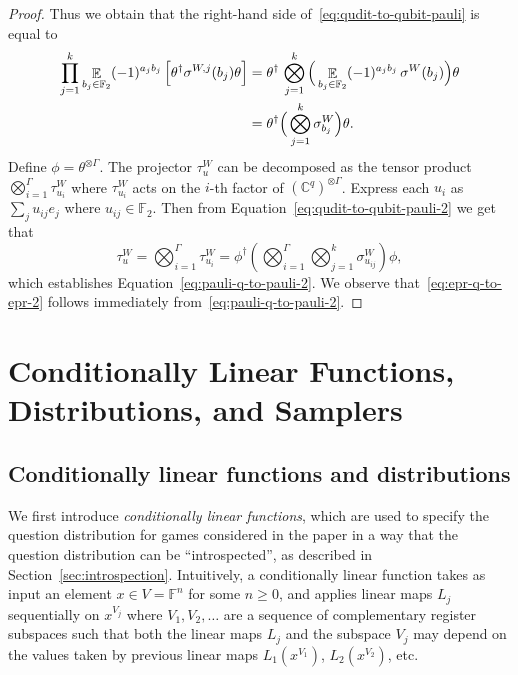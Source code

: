 \documentclass[11pt]{article}
\theoremstyle{definition}
\newcommand{\C}{\ensuremath{\mathbb{C}}}
\newcommand{\F}{\ensuremath{\mathbb{F}}}
\newcommand{\E}{\mathop{\mathbb{E}}\displaylimits} %
\begin{document}
\begin{proof}
  Thus we obtain that the right-hand side of~\eqref{eq:qudit-to-qubit-pauli} is
  equal to
  \begin{align}
		\prod_{j=1}^k \E_{b_j \in \F_2} (-1)^{a_j b_j} \,
    \Big [ \theta^\dagger \sigma^{W,j}(b_j) \theta \Big ]
    & = \theta^\dagger \, \bigotimes_{j=1}^k
      \Big ( \E_{b_j \in \F_2} (-1)^{a_j b_j} \, \sigma^{W}(b_j) \Big) \theta \\
		& = \theta^\dagger \Big (\bigotimes_{j=1}^k \sigma^W_{b_j} \Big) \theta.
		\label{eq:qudit-to-qubit-pauli-2}
  \end{align}
  Define $\phi = \theta^{\otimes \Gamma}$. The projector $\tau^W_u$ can be
  decomposed as the tensor product $\bigotimes_{i=1}^\Gamma \tau^{W}_{u_i}$
  where $\tau^{W}_{u_i}$ acts on the $i$-th factor of $(\C^q)^{\otimes \Gamma}$.
  Express each $u_i$ as $\sum_j u_{ij} e_j$ where $u_{ij} \in \F_2$. Then from
  Equation~\eqref{eq:qudit-to-qubit-pauli-2} we get that
  \begin{equation}
  	\tau^W_u = \bigotimes_{i=1}^\Gamma \tau^W_{u_i}
    = \phi^\dagger \left( \bigotimes_{i=1}^\Gamma
      \bigotimes_{j=1}^k \sigma^W_{u_{ij}} \right) \phi,
  \end{equation}
  which establishes Equation~\eqref{eq:pauli-q-to-pauli-2}. We observe
  that~\eqref{eq:epr-q-to-epr-2} follows immediately
  from~\eqref{eq:pauli-q-to-pauli-2}.
\end{proof}

\section{Conditionally Linear Functions, Distributions, and Samplers}
\label{sec:linear}

\subsection{Conditionally linear functions and distributions}
\label{sec:cl}

We first introduce \emph{conditionally linear functions}, which are used to
specify the question distribution for games considered in the paper in a way
that the question distribution can be ``introspected'', as described in
Section~\ref{sec:introspection}.
Intuitively, a conditionally linear function takes as input an element $x\in V =
\F^n$ for some $n\geq 0$, and applies linear maps $L_j$ sequentially on
$x^{V_j}$ where $V_1,V_2,\ldots $ are a sequence of complementary register
subspaces such that both the linear maps $L_j$ and the subspace $V_j$ may depend
on the values taken by previous linear maps $L_1(x^{V_1})$, $L_2(x^{V_2})$, etc.
\end{document}
